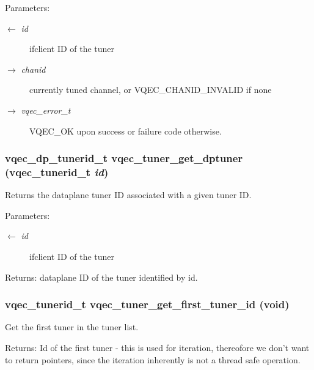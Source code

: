 \begin{Desc}
\item[Parameters:]
\begin{description}
\item[\mbox{$\leftarrow$} {\em id}]ifclient ID of the tuner \item[\mbox{$\rightarrow$} {\em chanid}]currently tuned channel, or VQEC\_\-CHANID\_\-INVALID if none \item[\mbox{$\rightarrow$} {\em vqec\_\-error\_\-t}]VQEC\_\-OK upon success or failure code otherwise. \end{description}
\end{Desc}
\subsubsection{\setlength{\rightskip}{0pt plus 5cm}vqec\_\-dp\_\-tunerid\_\-t vqec\_\-tuner\_\-get\_\-dptuner (vqec\_\-tunerid\_\-t {\em id})}\label{vqec__tuner_8h_daf05e0d27cbc7ceaf5485cb9dc404b0}


Returns the dataplane tuner ID associated with a given tuner ID.

\begin{Desc}
\item[Parameters:]
\begin{description}
\item[\mbox{$\leftarrow$} {\em id}]ifclient ID of the tuner \end{description}
\end{Desc}
\begin{Desc}
\item[Returns:]dataplane ID of the tuner identified by id. \end{Desc}
\subsubsection{\setlength{\rightskip}{0pt plus 5cm}vqec\_\-tunerid\_\-t vqec\_\-tuner\_\-get\_\-first\_\-tuner\_\-id (void)}\label{vqec__tuner_8h_8c9f59de01104b59e53b7271798bc422}


Get the first tuner in the tuner list. \begin{Desc}
\item[Returns:]Id of the first tuner - this is used for iteration, thereofore we don't want to return pointers, since the iteration inherently is not a thread safe operation. \end{Desc}
